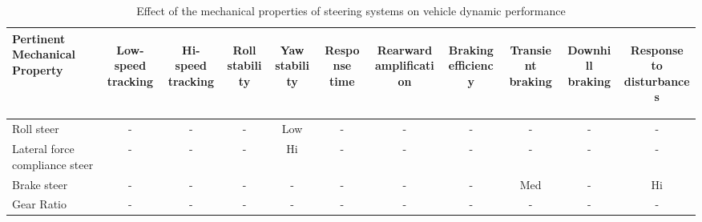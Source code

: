 \begin{table}[H]
	\centering\footnotesize
	\begin{threeparttable}
	
        \begin{tabulary}{\textwidth}{lcccccccccc}
            \toprule
            \textbf{Pertinent Mechanical Property} & \begin{sideways}\textbf{Low-speed tracking}\end{sideways} & \begin{sideways}\textbf{Hi-speed tracking}\end{sideways} & \begin{sideways}\textbf{Roll stability}\end{sideways} & \begin{sideways}\textbf{Yaw stability}\end{sideways} & \begin{sideways}\textbf{Response time}\end{sideways} & \begin{sideways}\textbf{Rearward amplification}\end{sideways} & \begin{sideways}\textbf{Braking efficiency}\end{sideways} & \begin{sideways}\textbf{Transient braking}\end{sideways} & \begin{sideways}\textbf{Downhill braking}\end{sideways} & \begin{sideways}\textbf{Response to disturbances}\end{sideways} \\\midrule
            Roll steer & -     & -     & -     & Low   & -     & -     & -     & -     & -     & - \\
            Lateral force compliance steer & -     & -     & -     & Hi    & -     & -     & -     & -     & -     & - \\
            Brake steer & -     & -     & -     & -     & -     & -     & -     & Med   & -     & Hi \\
            Gear Ratio & -     & -     & -     & -     & -     & -     & -     & -     & -     & -\\
            \bottomrule
		\end{tabulary}

		\caption{Effect of the mechanical properties of steering systems on vehicle dynamic performance \cite{Fancher1986}}
		\label{table:effect-of-the-mechanical-properties-of-steering-systems-on-vehicle-dynamic-performance}

	\end{threeparttable}
\end{table}

